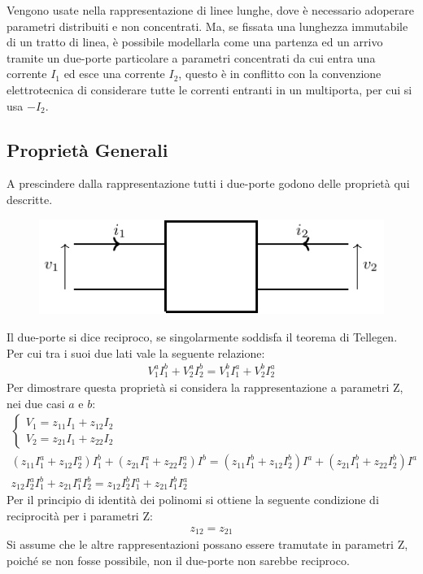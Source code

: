 \documentclass{article}
\numberwithin{equation}{subsection}
\begin{document}
Vengono usate nella rappresentazione di linee lunghe, dove è necessario adoperare parametri distribuiti e non concentrati. Ma, se fissata una lunghezza immutabile 
di un tratto di linea, è possibile modellarla come una partenza ed un arrivo tramite un 
due-porte particolare a parametri concentrati da cui entra una corrente $I_1$ ed esce una corrente $I_2$, questo è in conflitto con la convenzione elettrotecnica di considerare 
tutte le correnti entranti in un multiporta, per cui si usa $-I_2$. 

\subsection{Proprietà Generali}

A prescindere dalla rappresentazione tutti i due-porte godono delle proprietà qui descritte. 

\begin{figure}[ht]%
    \centering
    \includegraphics{due-porte-generico.pdf}
    \label{fig:due-porte-generico}
\end{figure}

Il due-porte si dice reciproco, se singolarmente soddisfa il teorema di Tellegen. Per cui tra i suoi due lati vale la seguente relazione: 
\begin{gather*}
    V_1^aI_1^b+V_2^aI_2^b=V_1^bI_1^a+V_2^bI_2^a
\end{gather*}
Per dimostrare questa proprietà si considera la rappresentazione a parametri Z, nei due casi $a$ e $b$:
\begin{gather*}
    \begin{cases}
        V_1=z_{11}I_1+z_{12}I_2\\
        V_2=z_{21}I_1+z_{22}I_2
    \end{cases}\\
    (z_{11}I_1^a+z_{12}I_2^a)I_1^b+(z_{21}I_1^a+z_{22}I_2^a)I^b=(z_{11}I_1^b+z_{12}I_2^b)I^a+(z_{21}I_1^b+z_{22}I_2^b)I^a\\
    z_{12}I_2^aI_1^b+z_{21}I_1^aI_2^b=z_{12}I_2^bI_1^a+z_{21}I_1^bI_2^a
\end{gather*}
Per il principio di identità dei polinomi si ottiene la seguente condizione di reciprocità per i parametri Z:
\begin{gather*}
    z_{12}=z_{21}
\end{gather*}
Si assume che le altre rappresentazioni possano essere tramutate in parametri Z, poiché se non fosse possibile, non il due-porte non sarebbe reciproco. 
\end{document}
